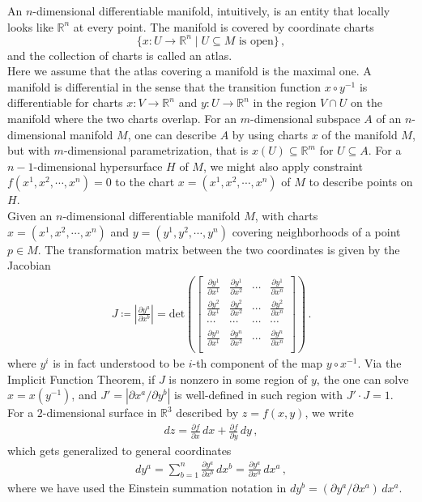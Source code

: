 \documentclass[11pt, onesided]{book}
\theoremstyle{break}
\theoremstyle{break}
\newcommand{\R}{\mathbb{R}}
\newcommand{\pd}{\partial}
\newcommand{\bmat}[1]{\begin{bmatrix} #1 \end{bmatrix}}
\begin{document}
An $n$-dimensional differentiable manifold, intuitively, is an entity that locally looks like $\R^n$ at every point. The manifold is covered by coordinate charts 
$$\{x:U \to \R^n \mid U \subseteq M \text{ is open}\}\,,$$ and the collection of charts is called an atlas.\\

Here we assume that the atlas covering a manifold is the maximal one. A manifold is differential in the sense that the transition function $x\circ y^{-1}$ is differentiable for charts $x:V \to \R^n$ and $y:U \to \R^n$ in the region $V \cap U$ on the manifold where the two charts overlap. For an $m$-dimensional subspace $A$ of an $n$-dimensional manifold $M$, one can describe $A$ by using charts $x$ of the manifold $M$, but with $m$-dimensional parametrization, that is $x(U) \subseteq \R^m$ for $U \subseteq A$. For a $n-1$-dimensional hypersurface $H$ of $M$, we might also apply constraint $f(x^1,x^2,\cdots, x^n) = 0$ to the chart $x=(x^1,x^2,\cdots, x^n)$ of $M$ to describe points on $H$. \\

Given an $n$-dimensional differentiable manifold $M$, with charts $x=(x^1,x^2,\cdots, x^n)$ and $y=(y^1,y^2,\cdots, y^n)$ covering neighborhoods of a point $p \in M$. The transformation matrix between the two coordinates is given by the Jacobian
\begin{align*}
J \coloneqq
\left|\frac{\pd y^a}{\pd x^b}\right| = \text{det}\left(\bmat{
\frac{\pd y^1}{\pd x^1} & \frac{\pd y^1}{\pd x^2} & \cdots & \frac{\pd y^1}{\pd x^n}\\
\frac{\pd y^2}{\pd x^1} & \frac{\pd y^2}{\pd x^2} & \cdots & \frac{\pd y^2}{\pd x^n}\\
\cdots & \cdots & \cdots & \cdots  \\
\frac{\pd y^n}{\pd x^1} & \frac{\pd y^n}{\pd x^2} & \cdots & \frac{\pd y^n}{\pd x^n}\\ }\right)\,.
\end{align*}
where $y^i$ is in fact understood to be $i$-th component of the map $y\circ x^{-1}$. Via the Implicit Function Theorem, if $J$ is nonzero in some region of $y$, the one can solve $x = x(y^{-1})$, and $J' = |\pd x^a / \pd y^b|$ is well-defined in such region with $J'\cdot J = 1$. \\

For a $2$-dimensional surface in $\R^3$ described by $z = f(x,y)$, we write 
\begin{align*}
dz = \frac{\pd f}{\pd x} \, dx + \frac{\pd f}{\pd y}\, dy\,,
\end{align*}
which gets generalized to general coordinates
\begin{align*}
dy^a = \sum_{b=1}^n  \frac{\pd y^a}{\pd x^b}\, dx^b =\frac{\pd y^a}{\pd x^a}\, dx^a \,,
\end{align*}
where we have used the Einstein summation notation in $dy^b  = (\pd y^a/ \pd x^a)\, dx^a$. 
\end{document}
